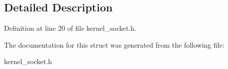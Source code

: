 \subsection{Detailed Description}


Definition at line 20 of file kernel\+\_\+socket.\+h.



The documentation for this struct was generated from the following file\+:\begin{DoxyCompactItemize}
\item 
kernel\+\_\+socket.\+h\end{DoxyCompactItemize}
